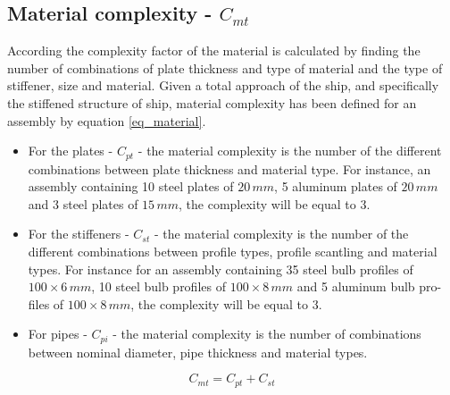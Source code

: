 \subsection{Material complexity - $C_{mt}$}
According \cite{Rigterink2013} the complexity factor of the material is calculated by finding the number of combinations of plate thickness and type of material and the type of stiffener, size and material. 
Given a total approach of the ship, and specifically  the stiffened structure of ship, material complexity has been defined for an assembly by equation \ref{eq_material}.


\begin{itemize}
\item For the plates - $C_{pt}$ - the material complexity is the number of the different combinations between plate thickness and material type. For instance, an assembly containing 10 steel plates of $20 \, mm$, 5 aluminum plates of $20 \, mm$ and 3 steel plates of $15 \, mm$, the complexity will be equal to 3.
\item For the stiffeners - $C_{st}$ - the material complexity is the number of the different combinations between profile types, profile scantling and material types. For instance for an assembly containing 35 steel bulb profiles of $100 \times 6 \, mm$, 10 steel bulb profiles of $100 \times 8 \, mm$ and 5 aluminum bulb pro-files of $100 \times 8 \, mm$, the complexity will be equal to 3.
\item For pipes - $C_{pi}$ - the material complexity is the number of combinations between nominal diameter, pipe thickness and material types.
\end{itemize}


\begin{equation}
\label{eq_material}
C_{mt} = C_{pt}+C_{st}
\end{equation}


	
